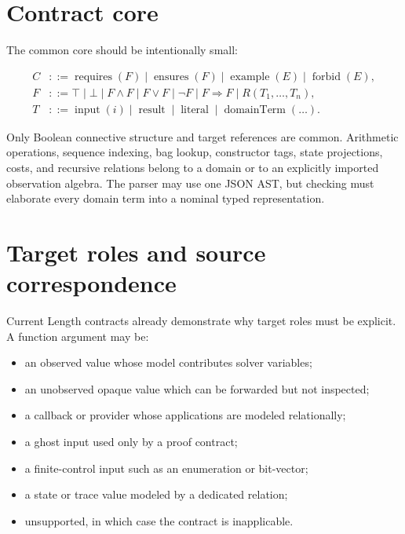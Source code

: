 \documentclass[11pt,oneside]{report}
\begin{document}
\section{Contract core}

The common core should be intentionally small:

\begin{align*}
C &::= \operatorname{requires}(F) \mid \operatorname{ensures}(F)
      \mid \operatorname{example}(E) \mid \operatorname{forbid}(E),\\
F &::= \top \mid \bot \mid F\land F \mid F\lor F \mid \neg F
      \mid F\Rightarrow F \mid R(T_1,\ldots,T_n),\\
T &::= \operatorname{input}(i) \mid \operatorname{result}
      \mid \operatorname{literal} \mid \operatorname{domainTerm}(\ldots).
\end{align*}

Only Boolean connective structure and target references are common. Arithmetic operations, sequence indexing, bag lookup, constructor tags, state projections, costs, and recursive relations belong to a domain or to an explicitly imported observation algebra. The parser may use one JSON AST, but checking must elaborate every domain term into a nominal typed representation.

\section{Target roles and source correspondence}

Current Length contracts already demonstrate why target roles must be explicit. A function argument may be:

\begin{itemize}[leftmargin=2em]
\item an observed value whose model contributes solver variables;
\item an unobserved opaque value which can be forwarded but not inspected;
\item a callback or provider whose applications are modeled relationally;
\item a ghost input used only by a proof contract;
\item a finite-control input such as an enumeration or bit-vector;
\item a state or trace value modeled by a dedicated relation;
\item unsupported, in which case the contract is inapplicable.
\end{itemize}
\end{document}
